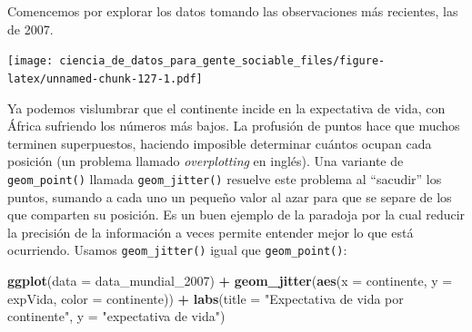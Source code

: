 \documentclass[]{book}
\newenvironment{Shaded}{\begin{snugshade}}{\end{snugshade}}
\newcommand{\KeywordTok}[1]{\textcolor[rgb]{0.13,0.29,0.53}{\textbf{#1}}}
\newcommand{\DataTypeTok}[1]{\textcolor[rgb]{0.13,0.29,0.53}{#1}}
\newcommand{\DecValTok}[1]{\textcolor[rgb]{0.00,0.00,0.81}{#1}}
\newcommand{\StringTok}[1]{\textcolor[rgb]{0.31,0.60,0.02}{#1}}
\newcommand{\OperatorTok}[1]{\textcolor[rgb]{0.81,0.36,0.00}{\textbf{#1}}}
\newcommand{\NormalTok}[1]{#1}
\begin{document}
Comencemos por explorar los datos tomando las observaciones más
recientes, las de 2007.

\begin{Shaded}
\end{Shaded}

\texttt{[image: ciencia\_de\_datos\_para\_gente\_sociable\_files/figure-latex/unnamed-chunk-127-1.pdf]}

Ya podemos vislumbrar que el continente incide en la expectativa de
vida, con África sufriendo los números más bajos. La profusión de puntos
hace que muchos terminen superpuestos, haciendo imposible determinar
cuántos ocupan cada posición (un problema llamado \emph{overplotting} en
inglés). Una variante de \texttt{geom\_point()} llamada
\texttt{geom\_jitter()} resuelve este problema al ``sacudir'' los
puntos, sumando a cada uno un pequeño valor al azar para que se separe
de los que comparten su posición. Es un buen ejemplo de la paradoja por
la cual reducir la precisión de la información a veces permite entender
mejor lo que está ocurriendo. Usamos \texttt{geom\_jitter()} igual que
\texttt{geom\_point()}:

\begin{Shaded}
\begin{Highlighting}[]
\KeywordTok{ggplot}\NormalTok{(}\DataTypeTok{data =}\NormalTok{ data_mundial_}\DecValTok{2007}\NormalTok{) }\OperatorTok{+}
\StringTok{    }\KeywordTok{geom_jitter}\NormalTok{(}\KeywordTok{aes}\NormalTok{(}\DataTypeTok{x =}\NormalTok{ continente, }\DataTypeTok{y =}\NormalTok{ expVida, }\DataTypeTok{color =}\NormalTok{ continente)) }\OperatorTok{+}
\StringTok{    }\KeywordTok{labs}\NormalTok{(}\DataTypeTok{title =} \StringTok{"Expectativa de vida por continente"}\NormalTok{,}
         \DataTypeTok{y =} \StringTok{"expectativa de vida"}\NormalTok{)}
\end{Highlighting}
\end{Shaded}
\end{document}
